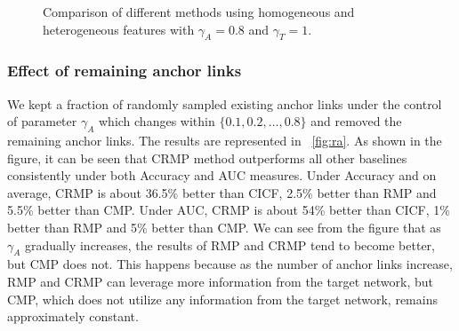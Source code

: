 \documentclass[conference]{IEEEtran}
\begin{document}
\begin{figure}[!t]
\centering
{}
\hfil
{}
\caption{Comparison of different methods using homogeneous and heterogeneous features with $\gamma_A=0.8$ and $\gamma_T=1$.}
\label{fig:het}
\end{figure}

\subsubsection{Effect of remaining anchor links}
We kept a fraction of randomly sampled existing anchor links under the control of parameter $\gamma_A$ which changes within $\{0.1,0.2,\dots,0.8\}$ and removed the remaining anchor links. The results are represented in \figurename~\ref{fig:ra}. As shown in the figure, it can be seen that CRMP method outperforms all other baselines consistently under both Accuracy and AUC measures. Under Accuracy and on average, CRMP is about 36.5\% better than CICF, 2.5\% better than RMP and 5.5\% better than CMP. Under AUC, CRMP is about 54\% better than CICF, 1\% better than RMP and 5\% better than CMP. We can see from the figure that as $\gamma_A$ gradually increases, the results of RMP and CRMP tend to become better, but CMP does not. This happens because as the number of anchor links increase, RMP and CRMP can leverage more information from the target network, but CMP, which does not utilize any information from the target network, remains approximately constant.

\newcommand{\anchorplot}[2]{
\begin{tikzpicture}
\begin{axis}
[
tiny,
width=1.9in,
legend style={at={(0.5,1.31)},
/tikz/every even column/.append style={column sep=0.2cm},
      anchor=north,legend columns=2, draw=none},
legend cell align=center,
ymin=0.45,ymax=#2,
xmin=0.0,xmax=0.9,
xtick={0.1, 0.2, 0.3, 0.4, 0.5, 0.6, 0.7, 0.8},
xmajorgrids,
ymajorgrids,
y tick label style={
    /pgf/number format/.cd,
        fixed,
        fixed zerofill,
        precision=2,
    /tikz/.cd
},
legend entries={CICF, CRMP, RMP, CMP},
]
\addplot[color=darkgray,thick,error bars/.cd,y dir=both,y explicit,] table[y error=e] {results/anchor-#1-cicf-ht.dat};
\addplot[color=cyan,thick,error bars/.cd,y dir=both,y explicit,] table[y error=e] {results/anchor-#1-crmp-ht.dat};
\addplot[color=orange,thick,error bars/.cd,y dir=both,y  explicit,] table[y error=e] {results/anchor-#1-rmp-ht.dat};
\addplot[color=purple,thick,error bars/.cd,y dir=both,y  explicit,] table[y error=e] {results/anchor-#1-cmp-ht.dat};
\end{axis}
\end{tikzpicture}
}
\end{document}

